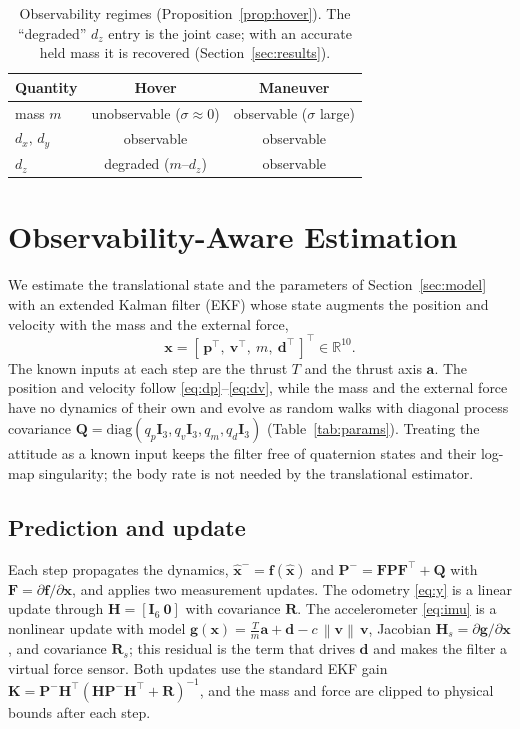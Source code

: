 \documentclass{ieeeaccess}
\newcommand{\R}{\mathbb{R}}
\newcommand{\norm}[1]{\left\| #1 \right\|}
\newcommand{\vect}[1]{\bm{#1}}
\newcommand{\mat}[1]{\mathbf{#1}}
\begin{document}
\begin{table}[t]
\centering
\caption{Observability regimes (Proposition~\ref{prop:hover}). The ``degraded''
$d_z$ entry is the joint case; with an accurate held mass it is recovered
(Section~\ref{sec:results}).}
\label{tab:obs}
\begin{tabular}{lcc}
\toprule
Quantity & Hover & Maneuver \\
\midrule
mass $m$        & unobservable ($\sigma\!\approx\!0$)         & observable ($\sigma$ large) \\
$d_x,\,d_y$     & observable                                  & observable \\
$d_z$           & degraded ($m$--$d_z$)                       & observable \\
\bottomrule
\end{tabular}
\end{table}

\section{Observability-Aware Estimation}\label{sec:mhe}

We estimate the translational state and the parameters of
Section~\ref{sec:model} with an extended Kalman filter (EKF) whose state augments
the position and velocity with the mass and the external force,
\begin{equation}
\vect{x}=[\,\vect{p}^{\!\top},\ \vect{v}^{\!\top},\ m,\ \vect{d}^{\!\top}\,]^{\!\top}\in\R^{10}.
\label{eq:state}
\end{equation}
The known inputs at each step are the thrust $T$ and the thrust axis $\vect{a}$.
The position and velocity follow \eqref{eq:dp}--\eqref{eq:dv}, while the mass and
the external force have no dynamics of their own and evolve as random walks with
diagonal process covariance $\mat{Q}=\mathrm{diag}(q_p\mat{I}_3,q_v\mat{I}_3,q_m,q_d\mat{I}_3)$
(Table~\ref{tab:params}). Treating the
attitude as a known input keeps the filter free of quaternion states and their
log-map singularity; the body rate is not needed by the translational estimator.

\subsection{Prediction and update}
Each step propagates the dynamics, $\hat{\vect{x}}^-=\vect{f}(\hat{\vect{x}})$
and $\mat{P}^-=\mat{F}\mat{P}\mat{F}^{\!\top}+\mat{Q}$ with
$\mat{F}=\partial\vect{f}/\partial\vect{x}$, and applies two measurement updates.
The odometry \eqref{eq:y} is a linear update through
$\mat{H}=[\mat{I}_6\ \mat{0}]$ with covariance $\mat{R}$. The accelerometer
\eqref{eq:imu} is a nonlinear update with model
$\vect{g}(\vect{x})=\tfrac{T}{m}\vect{a}+\vect{d}-c\,\norm{\vect{v}}\,\vect{v}$,
Jacobian $\mat{H}_s=\partial\vect{g}/\partial\vect{x}$, and covariance
$\mat{R}_s$; this residual is the term that drives $\vect{d}$ and makes the
filter a virtual force sensor. Both updates use the standard EKF gain
$\mat{K}=\mat{P}^-\mat{H}^{\!\top}(\mat{H}\mat{P}^-\mat{H}^{\!\top}+\mat{R})^{-1}$,
and the mass and force are clipped to physical bounds after each step.
\end{document}
